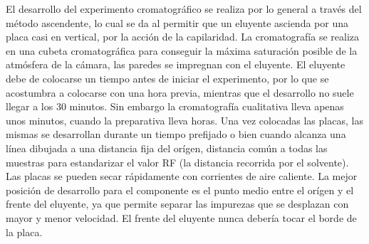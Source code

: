 El desarrollo del experimento cromatogr\'afico se realiza por lo general a trav\'es del m\'etodo ascendente, lo cual se da al permitir que un eluyente ascienda por una placa casi en vertical, por la acci\'on de la capilaridad. La cromatograf\'ia se realiza en una cubeta cromatogr\'afica para conseguir la m\'axima saturaci\'on posible de la atm\'osfera de la c\'amara, las paredes se impregnan con el eluyente. 
El eluyente debe de colocarse un tiempo antes de iniciar el experimento, por lo que se acostumbra a colocarse con una hora previa, mientras que el desarrollo no suele llegar a los 30 minutos. Sin embargo la cromatograf\'ia cualitativa lleva apenas unos minutos, cuando la preparativa lleva horas.
Una vez colocadas las placas, las mismas se desarrollan durante un tiempo prefijado o bien cuando alcanza una l\'inea dibujada a una distancia fija del or\'igen, distancia com\'un a todas las muestras para estandarizar el valor RF (la distancia recorrida por el solvente). Las placas se pueden secar r\'apidamente con corrientes de aire caliente.
La mejor posici\'on de desarrollo para el componente es el punto medio entre el or\'igen y el frente del eluyente, ya que permite separar las impurezas que se desplazan con mayor y menor velocidad. El frente del eluyente nunca deber\'ia tocar el borde de la placa.

